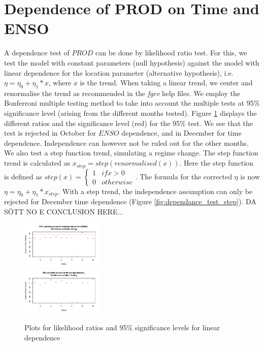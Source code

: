 \documentclass[10pt,conference,compsocconf]{IEEEtran}
\begin{document}
\section*{Dependence of PROD on Time and ENSO}
A dependence test of $PROD$ can be done by likelihood ratio test. For this, we test the model with constant parameters (null hypothesis) against the model with linear dependence for the location parameter (alternative hypothesis), i.e. $\eta = \eta_0 + \eta_1*x$, where $x$ is the trend. When taking a linear trend, we center and renormalise the trend  as recommended in the \textit{fgev} help files. We employ the Bonferroni multiple testing method to take into account the multiple tests at 95\% significance level (arising from the different months tested). Figure \ref{fig:dependance_test} displays the different ratios and the significance level (red) for the 95\% test. We see that the test is rejected in October for $ENSO$ dependence, and in December for time dependence. Independence can however not be ruled out for the other months. We also test a step function trend, simulating a regime change. The step function trend is calculated as $x_{step} = step(renormalised(x))$. Here the step function is defined as $step(x) = \begin{cases} 1 & if x>0\\ 0 & otherwise \end{cases}$. The formula for the corrected $\eta$ is now $\eta = \eta_0 + \eta_1*x_{step}$. With a step trend, the independence assumption can only be rejected for December time dependence (Figure \ref{fig:dependance_test_step}).
DA SÖTT NO E CONCLUSION HERE...

\begin{figure}
	\centering
	\includegraphics[width=0.35\textwidth]{../plots/enso_dependance.pdf}\\
	\includegraphics[width=0.35\textwidth]{../plots/time_dependance.pdf}
	\caption{Plots for likelihood ratios and 95\% significance levels for linear dependence}
	\label{fig:dependance_test}
\end{figure}
\end{document}
